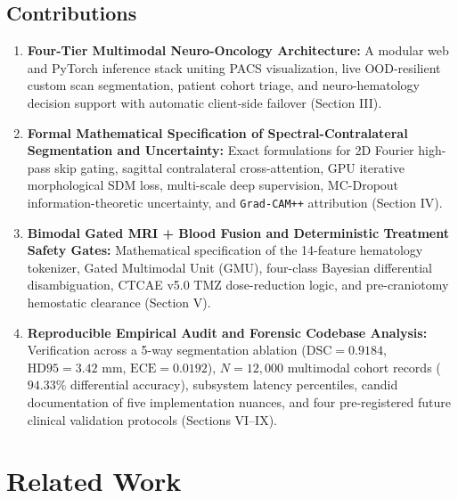 \documentclass[journal,onecolumn,10pt]{IEEEtran}
\begin{document}
\subsection{Contributions}
\begin{enumerate}
    \item \textbf{Four-Tier Multimodal Neuro-Oncology Architecture:} A modular web and PyTorch inference stack uniting PACS visualization, live OOD-resilient custom scan segmentation, patient cohort triage, and neuro-hematology decision support with automatic client-side failover (Section III).
    \item \textbf{Formal Mathematical Specification of Spectral-Contralateral Segmentation and Uncertainty:} Exact formulations for 2D Fourier high-pass skip gating, sagittal contralateral cross-attention, GPU iterative morphological SDM loss, multi-scale deep supervision, MC-Dropout information-theoretic uncertainty, and \texttt{Grad-CAM++} attribution (Section IV).
    \item \textbf{Bimodal Gated MRI + Blood Fusion and Deterministic Treatment Safety Gates:} Mathematical specification of the 14-feature hematology tokenizer, Gated Multimodal Unit (GMU), four-class Bayesian differential disambiguation, CTCAE v5.0 TMZ dose-reduction logic, and pre-craniotomy hemostatic clearance (Section V).
    \item \textbf{Reproducible Empirical Audit and Forensic Codebase Analysis:} Verification across a 5-way segmentation ablation ($\text{DSC} = 0.9184$, $\text{HD95} = 3.42\text{ mm}$, $\text{ECE} = 0.0192$), $N = 12,000$ multimodal cohort records ($94.33\%$ differential accuracy), subsystem latency percentiles, candid documentation of five implementation nuances, and four pre-registered future clinical validation protocols (Sections VI--IX).
\end{enumerate}

\section{Related Work}
\end{document}
